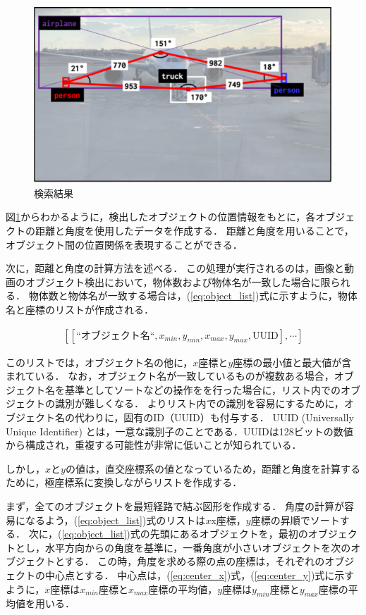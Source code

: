 \documentclass[a4j,12pt,dvipdfmx]{jreport}
\begin{document}
\begin{figure}[b]
  \centering
  \includegraphics[width=13cm]{image/object_relationship.png}
  \caption{検索結果}
  \label{fig:object_relationship}
\end{figure}

図\ref{fig:object_relationship}からわかるように，検出したオブジェクトの位置情報をもとに，各オブジェクトの距離と角度を使用したデータを作成する．
距離と角度を用いることで，オブジェクト間の位置関係を表現することができる．

次に，距離と角度の計算方法を述べる．
この処理が実行されるのは，画像と動画のオブジェクト検出において，物体数および物体名が一致した場合に限られる．
物体数と物体名が一致する場合は，(\ref{eq:object_list})式に示すように，物体名と座標のリストが作成される．

\begin{eqnarray}
  \label{eq:object_list}
  [[\text{“オブジェクト名“},x_{min},y_{min},x_{max},y_{max},\text{UUID}],\cdots]
\end{eqnarray}

このリストでは，オブジェクト名の他に，$x$座標と$y$座標の最小値と最大値が含まれている．
なお，オブジェクト名が一致しているものが複数ある場合，オブジェクト名を基準としてソートなどの操作をを行った場合に，リスト内でのオブジェクトの識別が難しくなる．
よりリスト内での識別を容易にするために，オブジェクト名の代わりに，固有のID（UUID）も付与する．
UUID (Universally Unique Identifier) とは，一意な識別子のことである．UUIDは128ビットの数値から構成され，重複する可能性が非常に低いことが知られている．

しかし，$x$と$y$の値は，直交座標系の値となっているため，距離と角度を計算するために，極座標系に変換しながらリストを作成する．

まず，全てのオブジェクトを最短経路で結ぶ図形を作成する．
角度の計算が容易になるよう，(\ref{eq:object_list})式のリストは$x$x座標，$y$座標の昇順でソートする．
次に，(\ref{eq:object_list})式の先頭にあるオブジェクトを，最初のオブジェクトとし，水平方向からの角度を基準に，一番角度が小さいオブジェクトを次のオブジェクトとする．
この時，角度を求める際の点の座標は，それぞれのオブジェクトの中心点とする．
中心点は，(\ref{eq:center_x})式，(\ref{eq:center_y})式に示すように，$x$座標は$x_{min}$座標と$x_{max}$座標の平均値，$y$座標は$y_{min}$座標と$y_{max}$座標の平均値を用いる．
\end{document}
